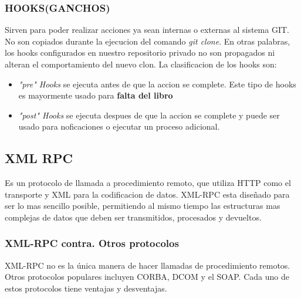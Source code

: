 \subsubsection{HOOKS(GANCHOS)}
Sirven para poder realizar acciones ya sean internas o externas al sistema GIT.
No son copiados durante la ejecucion del comando \textit{git clone}. En otras palabras, los hooks configurados en nuestro repositorio privado no son propagados ni alteran el 
comportamiento del nuevo clon.
La clasificacion de los hooks son:
\begin{itemize}
 \item \textit{"pre" Hooks} se ejecuta antes de que la accion se complete. Este tipo de hooks es mayormente usado para \textbf{falta del libro}
 \item \textit{"post" Hooks} se ejecuta despues de que la accion se complete y puede ser usado para noficaciones o ejecutar un proceso adicional.
\end{itemize}

\subsection{XML RPC}
Es un protocolo de llamada a procedimiento remoto, que utiliza HTTP como el transporte y XML para la codificacion de datos. XML-RPC esta diseñado para ser lo mas sencillo posible, permitiendo al mismo tiempo las estructuras mas complejas de datos que deben ser transmitidos, procesados y devueltos.

\subsubsection{XML-RPC contra. Otros protocolos}

XML-RPC no es la única manera de hacer llamadas de procedimiento remotos. Otros protocolos populares incluyen CORBA, DCOM y el SOAP. Cada uno de estos protocolos tiene ventajas y desventajas.

